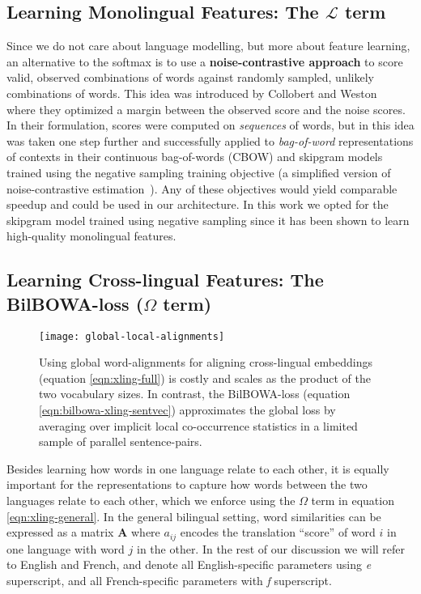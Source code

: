 \documentclass[10pt]{article}
\newcommand\bld[1]{\textbf{#1}}
\newcommand\mat[1]{\mathbf{#1}}
\newcommand\loss{\mathcal{L}}
\begin{document}
\subsection{Learning Monolingual Features: The $\loss$ term}
\label{sec:bilbowa-monoling}

Since we do not care about language modelling, but more about feature learning,
an alternative to the softmax is to use a \bld{noise-contrastive approach} to
score valid, observed combinations of words against randomly sampled, unlikely
combinations of words. This idea was introduced by Collobert and
Weston~\cite{collobert2011natural} where they optimized a margin between the
observed score and the noise scores. In their formulation, scores were computed
on \emph{sequences} of words, but in \cite{mikolov2013exploiting} this idea was taken one step further and
successfully applied to \emph{bag-of-word} representations of contexts in their
continuous bag-of-words (CBOW) and skipgram models trained using the negative 
sampling training objective (a simplified version of noise-contrastive estimation~\cite{mnih2012fast}). 
Any of these
objectives would yield comparable speedup and could be used in our architecture. In
this work we opted for the skipgram model trained using negative sampling since it
has been shown to learn high-quality monolingual features.



\subsection{Learning Cross-lingual Features: The BilBOWA-loss ($\Omega$ term)}
\label{sec:bilbowa-xling}

\begin{figure*}
  \begin{center}
    \texttt{[image: global-local-alignments]}
  \end{center}
  \caption{Using global word-alignments for aligning cross-lingual embeddings 
  (equation \ref{eqn:xling-full}) is costly 
  and scales as the product of the two vocabulary sizes. In contrast, the BilBOWA-loss 
  (equation \ref{eqn:bilbowa-xling-sentvec}) approximates the global loss by averaging over 
  implicit local co-occurrence statistics in a limited sample of parallel sentence-pairs.}
  \label{fig:bilbowa-approximation}
\end{figure*}

Besides learning how words in one language relate to each other, it is equally 
important for the representations to capture how words between the two languages
relate to each other, which we enforce using the $\Omega$ term in equation
\ref{eqn:xling-general}.  In the general bilingual setting, word
similarities can be expressed as a matrix $\mat{A}$ where $a_{ij}$ encodes the
translation ``score'' of word $i$ in one language with word $j$ in the other.
In the rest of our discussion we will refer to English and French, and denote all 
English-specific parameters using \emph{e} superscript, and all French-specific parameters
with \emph{f} superscript. 
\end{document}

